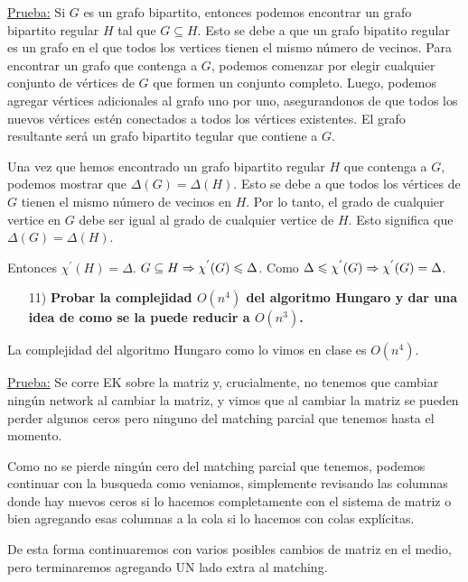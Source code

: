 \documentclass[12pt,a4paper]{article}
\begin{document}
\underline{Prueba:} Si $G$ es un grafo bipartito, entonces podemos encontrar un 
grafo bipartito regular $H$ tal que $G \subseteq H$. Esto se debe a que un grafo 
bipatito regular es un grafo en el que todos los vertices tienen el mismo número 
de vecinos. Para encontrar un grafo que contenga a $G$, podemos comenzar por 
elegir cualquier conjunto de vértices de $G$ que formen un conjunto 
completo. Luego, podemos agregar vértices adicionales al grafo uno por uno, 
asegurandonos de que todos los nuevos vértices estén conectados a todos los 
vértices existentes. El grafo resultante será un grafo bipartito tegular que 
contiene a $G$.
\medskip

Una vez que hemos encontrado un grafo bipartito regular $H$ que contenga a $G$, 
podemos mostrar que $\Delta(G) = \Delta(H)$. Esto se debe a que todos los 
vértices de $G$ tienen el mismo número de vecinos en $H$. Por lo tanto, el 
grado de cualquier vertice en $G$ debe ser igual al grado de cualquier 
vertice de $H$. Esto significa que $\Delta(G) = \Delta(H)$.
\medskip

Entonces $\chi^{'}(H) = \Delta$. $G \subseteq H \Rightarrow \chi^{'}(G) \leqslant \Delta$. 
Como $\Delta \leqslant \chi^{'}(G) \Rightarrow \chi^{'}(G) = \Delta$.

\begin{itemize}
    \item [11)] \textbf{Probar la complejidad $O(n^{4})$ del algoritmo Hungaro y 
    dar una idea de como se la puede reducir a $O(n^{3})$.}
    \label{dem:hungaro}
\end{itemize}

\begin{teorema} La complejidad del algoritmo Hungaro como lo vimos en clase es $O(n^4)$.
\end{teorema}

\underline{Prueba:} 
Se corre EK sobre la matriz y, crucialmente, no tenemos que cambiar ningún network 
al cambiar la matriz, y vimos que al cambiar la matriz se pueden perder algunos 
ceros pero ninguno del matching parcial que tenemos hasta el momento.
\medskip

Como no se pierde ningún cero del matching parcial que tenemos, podemos continuar 
con la busqueda como veniamos, simplemente revisando las columnas donde hay nuevos 
ceros si lo hacemos completamente con el sistema de matriz o bien agregando esas 
columnas a la cola si lo hacemos con colas explícitas.
\medskip

De esta forma continuaremos con varios posibles cambios de matriz en el medio, 
pero terminaremos agregando UN lado extra al matching.
\medskip
\end{document}
